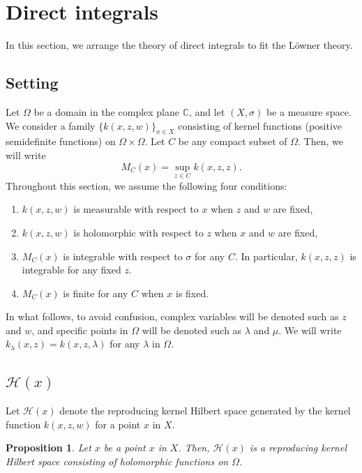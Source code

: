\documentclass[12pt]{article}
\newtheorem{prop}[thm]{Proposition}
\numberwithin{equation}{section}
\newcommand{\C}{{\mathbb C}}
\newcommand{\cH}{{\mathcal H}}
\newcommand{\lam}{\lambda}
\begin{document}
\section{Direct integrals}\label{sec:1}

In this section, we arrange the theory of direct integrals to fit the L\"{o}wner theory. 
\subsection{Setting}
Let $\Omega$ be a domain in the complex plane $\C$, and let $(X,\sigma)$ be a measure space.  
We consider a family $\{k(x,z,w)\}_{x\in X}$ consisting of kernel functions (positive semidefinite functions) on $\Omega\times \Omega$. 
Let $C$ be any compact subset of $\Omega$. 
Then, we will write 
\[
M_C(x)=\sup_{z\in C}k(x,z,z).
\] 
Throughout this section, we assume the following four conditions: 
\begin{enumerate}
\item[(A)] $k(x,z,w)$ is measurable with respect to $x$ when $z$ and $w$ are fixed, 
\item[(B)] $k(x,z,w)$ is holomorphic with respect to $z$ when $x$ and $w$ are fixed, 
\item[(C)] $M_C(x)$ is integrable with respect to $\sigma$ for any $C$. In particular, $k(x,z,z)$ is integrable for any fixed $z$. 
\item[(D)] $M_C(x)$ is finite for any $C$ when $x$ is fixed. 
\end{enumerate}
In what follows, 
to avoid confusion, complex variables will be denoted such as $z$ and $w$, 
and specific points in $\Omega$ will be denoted such as $\lam$ and $\mu$. 
We will write $k_{\lam}(x,z)=k(x,z,\lam)$ for any $\lam$ in $\Omega$. 

\subsection{$\cH(x)$}
Let $\cH(x)$ denote the reproducing kernel Hilbert space generated 
by the kernel function $k(x,z,w)$ for a point $x$ in $X$. 

\begin{prop}\label{prop:4-1} 
Let $x$ be a point $x$ in $X$. 
Then, $\cH(x)$ is a reproducing kernel Hilbert space consisting of holomorphic functions on $\Omega$. 
\end{prop}
\end{document}
